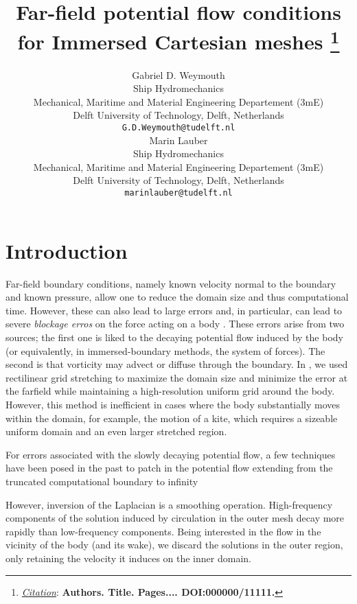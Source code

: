 \documentclass{article}
\title{Far-field potential flow conditions for Immersed Cartesian meshes
\thanks{\textit{\underline{Citation}}: 
\textbf{Authors. Title. Pages.... DOI:000000/11111.}} 
}
\author{
    Gabriel D. Weymouth\\
    Ship Hydromechanics\\
    Mechanical, Maritime and Material Engineering Departement (3mE) \\
    Delft University of Technology, Delft, Netherlands \\
    \texttt{G.D.Weymouth@tudelft.nl} \\
    \AND
    Marin Lauber\\
    Ship Hydromechanics\\
    Mechanical, Maritime and Material Engineering Departement (3mE) \\
    Delft University of Technology, Delft, Netherlands \\
    \texttt{marinlauber@tudelft.nl} \\
}
\begin{document}
\maketitle


\begin{abstract}
\lipsum[1]
\end{abstract}




\section{Introduction}

Far-field boundary conditions, namely known velocity normal to the boundary and known pressure, allow one to reduce the domain size and thus computational time. However, these can also lead to large errors and, in particular, can lead to severe \emph{blockage erros} on the force acting on a body \cite{Colonius2008}. These errors arise from two sources; the first one is liked to the decaying potential flow induced by the body (or equivalently, in immersed-boundary methods, the system of forces). The second is that vorticity may advect or diffuse through the boundary. In \cite{Maertens2015, Lauber2022}, we used rectilinear grid stretching to maximize the domain size and minimize the error at the farfield while maintaining a high-resolution uniform grid around the body. However, this method is inefficient in cases where the body substantially moves within the domain, for example, the motion of a kite, which requires a sizeable uniform domain and an even larger stretched region. 


For errors associated with the slowly decaying potential flow, a few techniques have been posed in the past to patch in the potential flow extending from the truncated computational boundary to infinity \cite{Colonius2008}

However, inversion of the Laplacian is a smoothing operation. High-frequency components of the solution induced by circulation in the outer mesh decay more rapidly than low-frequency components. Being interested in the flow in the vicinity of the body (and its wake), we discard the solutions in the outer region, only retaining the velocity it induces on the inner domain.
\end{document}

